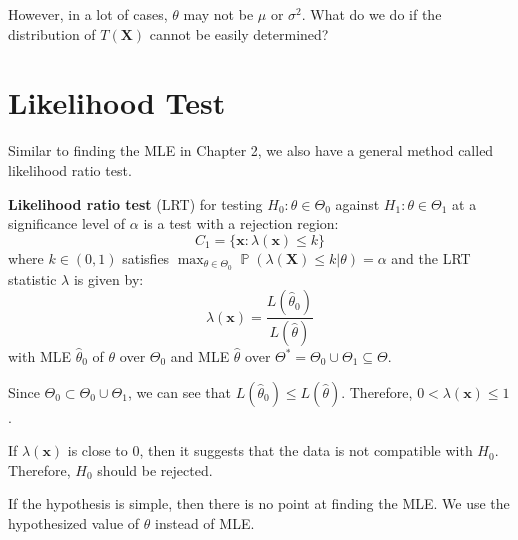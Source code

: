 \documentclass{huhtakm-template-book-v2}
\DeclareMathOperator{\prob}{\mathbb{P}}
\begin{document}
However, in a lot of cases, $\theta$ may not be $\mu$ or $\sigma^{2}$. What do we do if the distribution of $T(\mathbf{X})$ cannot be easily determined?

\newpage
\section{Likelihood Test}
Similar to finding the MLE in Chapter 2, we also have a general method called likelihood ratio test.
\begin{defn}
	\textbf{Likelihood ratio test} (LRT) for testing $H_{0}:\theta\in\Theta_{0}$ against $H_{1}:\theta\in\Theta_{1}$ at a significance level of $\alpha$ is a test with a rejection region:
	\begin{equation*}
		C_{1}=\{\mathbf{x}:\lambda(\mathbf{x})\leq k\}
	\end{equation*}
	where $k\in(0,1)$ satisfies $\max_{\theta\in\Theta_{0}}\prob(\lambda(\mathbf{X})\leq k|\theta)=\alpha$ and the LRT statistic $\lambda$ is given by:
	\begin{equation*}
		\lambda(\mathbf{x})=\frac{L(\hat{\theta}_{0})}{L(\hat{\theta})}
	\end{equation*}
	with MLE $\hat{\theta}_{0}$ of $\theta$ over $\Theta_{0}$ and MLE $\hat{\theta}$ over $\Theta^{*}=\Theta_{0}\cup\Theta_{1}\subseteq\Theta$.
\end{defn}
\begin{rem}
	Since $\Theta_{0}\subset\Theta_{0}\cup\Theta_{1}$, we can see that $L(\hat{\theta}_{0})\leq L(\hat{\theta})$. Therefore, $0<\lambda(\mathbf{x})\leq 1$.
\end{rem}
\begin{rem}
	If $\lambda(\mathbf{x})$ is close to $0$, then it suggests that the data is not compatible with $H_{0}$. Therefore, $H_{0}$ should be rejected.
\end{rem}
\begin{rem}
	If the hypothesis is simple, then there is no point at finding the MLE. We use the hypothesized value of $\theta$ instead of MLE.
\end{rem}
\end{document}
